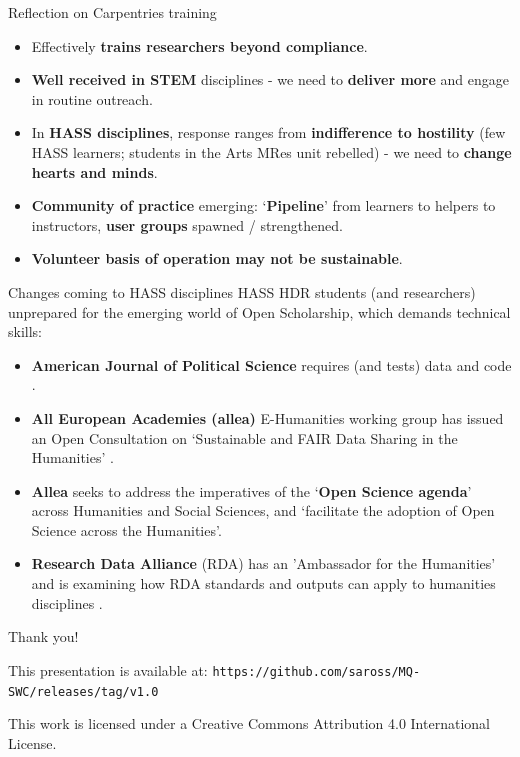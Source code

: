 \documentclass[aspectratio=169, 11pt]{beamer} %
\begin{document}
\begin{frame}{Reflection on Carpentries training}
  \begin{itemize}[label=\textbullet]
    \item Effectively \textbf{trains researchers beyond compliance}.
    \item \textbf{Well received in STEM} disciplines - we need to \textbf{deliver more} and engage in routine outreach.
    \item In \textbf{HASS disciplines}, response ranges from \textbf{indifference to hostility} (few HASS learners; students in the Arts MRes unit rebelled) - we need to \textbf{change hearts and minds}.
    \item \textbf{Community of practice} emerging: `\textbf{Pipeline}' from learners to helpers to instructors, \textbf{user groups} spawned / strengthened.
    \item \textbf{Volunteer basis of operation may not be sustainable}.
  \end{itemize}
\end{frame}

\begin{frame}{Changes coming to HASS disciplines}
  HASS HDR students (and researchers) unprepared for the emerging world of Open Scholarship, which demands technical skills:
    \begin{itemize}[label=\textbullet]
        \item \textbf{American Journal of Political Science} requires (and tests) data and code \cite{Jacoby2017-lw, Ajps2015-ex}.
        \item \textbf{All European Academies (allea)} E-Humanities working group \cite{Allea2019-wy} has issued an Open Consultation on `Sustainable and FAIR Data Sharing in the Humanities' \cite{Allea2019-aw}.
        \item \textbf{Allea} seeks to address the imperatives of the `\textbf{Open Science agenda}' across Humanities and Social Sciences, and `facilitate the adoption of Open Science across the Humanities'.
        \item \textbf{Research Data Alliance} (RDA) has an 'Ambassador for the Humanities' and is examining how RDA standards and outputs can apply to humanities disciplines \cite{Rda2019-wc}.
    \end{itemize}
\end{frame}

\begin{frame}{Thank you!}


This presentation is available at: \texttt{https://github.com/saross/MQ-SWC/releases/tag/v1.0}

This work is licensed under a Creative Commons Attribution 4.0 International License.

\end{frame}
\end{document}
